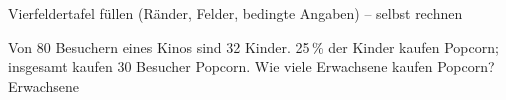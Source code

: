 \begin{aufgabe}{Vierfeldertafel füllen (Ränder, Felder, bedingte Angaben) – selbst rechnen}
\begin{teile}
\teil Von 80 Besuchern eines Kinos sind 32 Kinder. 25\,\% der Kinder kaufen Popcorn; insgesamt kaufen 30 Besucher Popcorn. Wie viele Erwachsene kaufen Popcorn? \leerfeld Erwachsene
\end{teile}
\end{aufgabe}
